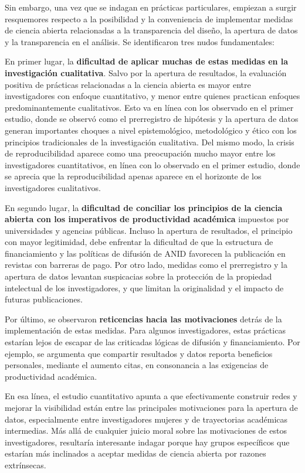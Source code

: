 \documentclass[
  letterpaper,
  DIV=11,
  numbers=noendperiod]{scrreprt}
\begin{document}
Sin embargo, una vez que se indagan en prácticas particulares, empiezan
a surgir resquemores respecto a la posibilidad y la conveniencia de
implementar medidas de ciencia abierta relacionadas a la transparencia
del diseño, la apertura de datos y la transparencia en el análisis. Se
identificaron tres nudos fundamentales:

En primer lugar, la \textbf{dificultad de aplicar muchas de estas
medidas en la investigación cualitativa}. Salvo por la apertura de
resultados, la evaluación positiva de prácticas relacionadas a la
ciencia abierta es mayor entre investigadores con enfoque cuantitativo,
y menor entre quienes practican enfoques predominantemente cualitativos.
Esto va en línea con los observado en el primer estudio, donde se
observó como el prerregistro de hipótesis y la apertura de datos generan
importantes choques a nivel epistemológico, metodológico y ético con los
principios tradicionales de la investigación cualitativa. Del mismo
modo, la crisis de reproducibilidad aparece como una preocupación mucho
mayor entre los investigadores cuantitativos, en línea con lo observado
en el primer estudio, donde se aprecia que la reproducibilidad apenas
aparece en el horizonte de los investigadores cualitativos.

En segundo lugar, la \textbf{dificultad de conciliar los principios de
la ciencia abierta con los imperativos de productividad académica}
impuestos por universidades y agencias públicas. Incluso la apertura de
resultados, el principio con mayor legitimidad, debe enfrentar la
dificultad de que la estructura de financiamiento y las políticas de
difusión de ANID favorecen la publicación en revistas con barreras de
pago. Por otro lado, medidas como el prerregistro y la apertura de datos
levantan suspicacias sobre la protección de la propiedad intelectual de
los investigadores, y que limitan la originalidad y el impacto de
futuras publicaciones.

Por último, se observaron \textbf{reticencias hacia las motivaciones}
detrás de la implementación de estas medidas. Para algunos
investigadores, estas prácticas estarían lejos de escapar de las
criticadas lógicas de difusión y financiamiento. Por ejemplo, se
argumenta que compartir resultados y datos reporta beneficios
personales, mediante el aumento citas, en consonancia a las exigencias
de productividad académica.

En esa línea, el estudio cuantitativo apunta a que efectivamente
construir redes y mejorar la visibilidad están entre las principales
motivaciones para la apertura de datos, especialmente entre
investigadores mujeres y de trayectorias académicas intermedias. Más
allá de cualquier juicio moral sobre las motivaciones de estos
investigadores, resultaría interesante indagar porque hay grupos
específicos que estarían más inclinados a aceptar medidas de ciencia
abierta por razones extrínsecas.
\end{document}
